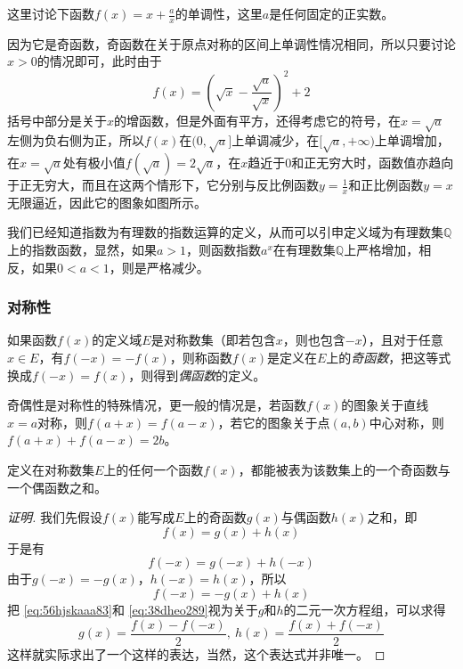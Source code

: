 \begin{example}
这里讨论下函数$f(x)=x+\frac{a}{x}$的单调性，这里$a$是任何固定的正实数。

因为它是奇函数，奇函数在关于原点对称的区间上单调性情况相同，所以只要讨论$x>0$的情况即可，此时由于
$$
f(x)=\left( \sqrt{x}-\frac{\sqrt{a}}{\sqrt{x}} \right)^2+2
$$
括号中部分是关于$x$的增函数，但是外面有平方，还得考虑它的符号，在$x=\sqrt{a}$左侧为负右侧为正，所以$f(x)$在$(0,\sqrt{a}]$上单调减少，在$[\sqrt{a},+\infty)$上单调增加，在$x=\sqrt{a}$处有极小值$f(\sqrt{a})=2\sqrt{a}$，在$x$趋近于0和正无穷大时，函数值亦趋向于正无穷大，而且在这两个情形下，它分别与反比例函数$y=\frac{1}{x}$和正比例函数$y=x$无限逼近，因此它的图象如图所示。
\end{example}

\begin{example}
  我们已经知道指数为有理数的指数运算的定义，从而可以引申定义域为有理数集$\mathbb{Q}$上的指数函数，显然，如果$a>1$，则函数指数$a^x$在有理数集$\mathbb{Q}$上严格增加，相反，如果$0<a<1$，则是严格减少。
\end{example}

\subsubsection{对称性}
\label{sec:symmetric-of-function}

\begin{definition}
  如果函数$f(x)$的定义域$E$是对称数集（即若包含$x$，则也包含$-x$），且对于任意$x \in E$，有$f(-x)=-f(x)$，则称函数$f(x)$是定义在$E$上的\emph{奇函数}，把这等式换成$f(-x)=f(x)$，则得到\emph{偶函数}的定义。
\end{definition}

奇偶性是对称性的特殊情况，更一般的情况是，若函数$f(x)$的图象关于直线$x=a$对称，则$f(a+x)=f(a-x)$，若它的图象关于点$(a,b)$中心对称，则$f(a+x)+f(a-x)=2b$。

\begin{theorem}
  定义在对称数集$E$上的任何一个函数$f(x)$，都能被表为该数集上的一个奇函数与一个偶函数之和。
\end{theorem}

\begin{proof}[证明]
  我们先假设$f(x)$能写成$E$上的奇函数$g(x)$与偶函数$h(x)$之和，即
  \begin{equation}
    \label{eq:56hjskaaa83}
   f(x)=g(x)+h(x) 
  \end{equation}
  于是有
  \[ f(-x)=g(-x)+h(-x) \]
  由于$g(-x)=-g(x)$，$h(-x)=h(x)$，所以
  \begin{equation}
    \label{eq:38dheo289}
   f(-x) = -g(x)+h(x) 
  \end{equation}
  把 \autoref{eq:56hjskaaa83}和 \autoref{eq:38dheo289}视为关于$g$和$h$的二元一次方程组，可以求得
  \[ g(x) = \frac{f(x)-f(-x)}{2}, \  h(x) = \frac{f(x)+f(-x)}{2} \]
  这样就实际求出了一个这样的表达，当然，这个表达式并非唯一。
\end{proof}

